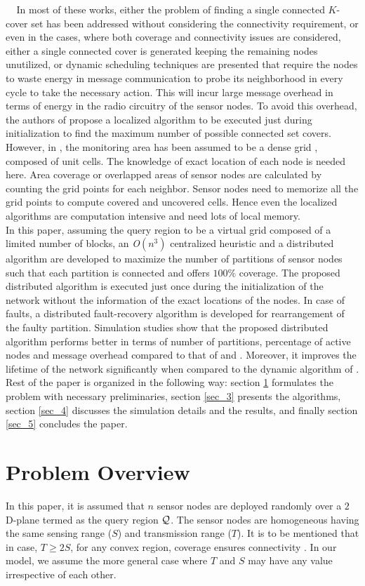 \documentclass{acm_proc_article-sp}
\begin{document}
$~~~~~$In most of these works, either the problem of finding a single connected $K$-cover set has been addressed without considering the connectivity requirement, or even in the cases, where both coverage and connectivity 
issues are considered, either a single connected cover is generated keeping the remaining nodes unutilized, or dynamic scheduling techniques are presented that require the nodes to waste energy in message communication to probe its neighborhood in every cycle to take the necessary action. This will incur large message overhead in terms of energy in the radio circuitry of the sensor nodes. To avoid this overhead, the authors of \cite{Pervin} propose a localized algorithm to be executed just during initialization to find the maximum number of possible connected set covers. However, in \cite{Gallais,Pervin,Tian}, the monitoring area has been assumed to be a dense grid \cite{Wei}, \cite{RSS} composed of unit cells. The knowledge of exact location of each node is needed here. Area 
coverage or overlapped areas of sensor nodes are calculated by counting the grid points for each neighbor. Sensor nodes need to memorize all the grid points to compute covered and uncovered cells. Hence even the localized algorithms are computation intensive and need lots of local memory.\\
In this paper, assuming the query region to be a virtual grid composed of a limited number of blocks, an {\it O}$(n^3)$ centralized heuristic and a distributed algorithm are developed to maximize the number of partitions of sensor nodes such that each partition is connected and offers $100\%$ coverage. The proposed distributed algorithm is executed just once during the initialization of the network without the information of the exact locations of the nodes. In case of faults, a distributed fault-recovery algorithm is developed for rearrangement of the faulty partition. Simulation studies show that the proposed distributed algorithm performs better in terms of number of partitions, percentage of active nodes and message overhead compared to that of \cite{Gallais} and \cite{Pervin}. Moreover, it improves the lifetime of the network significantly when compared to the dynamic algorithm of \cite{Gallais}.\\
Rest of the paper is organized in the following way: section \ref{sec_2} formulates the problem with necessary preliminaries, section \ref{sec_3} presents the algorithms, section \ref{sec_4} discusses the simulation details and the results, and finally section \ref{sec_5} concludes the paper.
\section{{ Problem Overview}}
\label{sec_2}
 In this paper, it is assumed that $n$ sensor nodes are deployed randomly over a $2$D-plane termed as the query region $\cal Q$. The sensor nodes are homogeneous having the same sensing range ($S$) and transmission range ($T$). It is to be mentioned that in case, $T \geq 2S$, for any convex region, coverage ensures connectivity \cite{Wang}. In our model, we assume the more general case where $T$ and $S$ may have any value irrespective of each other.
\end{document}
